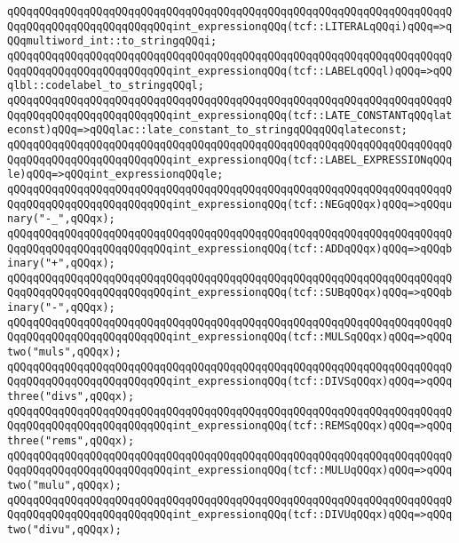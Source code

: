 \verb|qQQqqQQqqQQqqQQqqQQqqQQqqQQqqQQqqQQqqQQqqQQqqQQqqQQqqQQqqQQqqQQqqQQqqQQqqQQqqQQqqQQqqQQqqQQqqQQqint_expressionqQQq(tcf::LITERALqQQqi)qQQq=>qQQqmultiword_int::to_stringqQQqi;|\newline
\verb|qQQqqQQqqQQqqQQqqQQqqQQqqQQqqQQqqQQqqQQqqQQqqQQqqQQqqQQqqQQqqQQqqQQqqQQqqQQqqQQqqQQqqQQqqQQqqQQqint_expressionqQQq(tcf::LABELqQQql)qQQq=>qQQqlbl::codelabel_to_stringqQQql;|\newline
\verb|qQQqqQQqqQQqqQQqqQQqqQQqqQQqqQQqqQQqqQQqqQQqqQQqqQQqqQQqqQQqqQQqqQQqqQQqqQQqqQQqqQQqqQQqqQQqqQQqint_expressionqQQq(tcf::LATE_CONSTANTqQQqlateconst)qQQq=>qQQqlac::late_constant_to_stringqQQqqQQqlateconst;|\newline
\verb|qQQqqQQqqQQqqQQqqQQqqQQqqQQqqQQqqQQqqQQqqQQqqQQqqQQqqQQqqQQqqQQqqQQqqQQqqQQqqQQqqQQqqQQqqQQqqQQqint_expressionqQQq(tcf::LABEL_EXPRESSIONqQQqle)qQQq=>qQQqint_expressionqQQqle;|\newline
\verb|qQQqqQQqqQQqqQQqqQQqqQQqqQQqqQQqqQQqqQQqqQQqqQQqqQQqqQQqqQQqqQQqqQQqqQQqqQQqqQQqqQQqqQQqqQQqqQQqint_expressionqQQq(tcf::NEGqQQqx)qQQq=>qQQqunary("-_",qQQqx);|\newline
\verb|qQQqqQQqqQQqqQQqqQQqqQQqqQQqqQQqqQQqqQQqqQQqqQQqqQQqqQQqqQQqqQQqqQQqqQQqqQQqqQQqqQQqqQQqqQQqqQQqint_expressionqQQq(tcf::ADDqQQqx)qQQq=>qQQqbinary("+",qQQqx);|\newline
\verb|qQQqqQQqqQQqqQQqqQQqqQQqqQQqqQQqqQQqqQQqqQQqqQQqqQQqqQQqqQQqqQQqqQQqqQQqqQQqqQQqqQQqqQQqqQQqqQQqint_expressionqQQq(tcf::SUBqQQqx)qQQq=>qQQqbinary("-",qQQqx);|\newline
\verb|qQQqqQQqqQQqqQQqqQQqqQQqqQQqqQQqqQQqqQQqqQQqqQQqqQQqqQQqqQQqqQQqqQQqqQQqqQQqqQQqqQQqqQQqqQQqqQQqint_expressionqQQq(tcf::MULSqQQqx)qQQq=>qQQqtwo("muls",qQQqx);|\newline
\verb|qQQqqQQqqQQqqQQqqQQqqQQqqQQqqQQqqQQqqQQqqQQqqQQqqQQqqQQqqQQqqQQqqQQqqQQqqQQqqQQqqQQqqQQqqQQqqQQqint_expressionqQQq(tcf::DIVSqQQqx)qQQq=>qQQqthree("divs",qQQqx);|\newline
\verb|qQQqqQQqqQQqqQQqqQQqqQQqqQQqqQQqqQQqqQQqqQQqqQQqqQQqqQQqqQQqqQQqqQQqqQQqqQQqqQQqqQQqqQQqqQQqqQQqint_expressionqQQq(tcf::REMSqQQqx)qQQq=>qQQqthree("rems",qQQqx);|\newline
\verb|qQQqqQQqqQQqqQQqqQQqqQQqqQQqqQQqqQQqqQQqqQQqqQQqqQQqqQQqqQQqqQQqqQQqqQQqqQQqqQQqqQQqqQQqqQQqqQQqint_expressionqQQq(tcf::MULUqQQqx)qQQq=>qQQqtwo("mulu",qQQqx);|\newline
\verb|qQQqqQQqqQQqqQQqqQQqqQQqqQQqqQQqqQQqqQQqqQQqqQQqqQQqqQQqqQQqqQQqqQQqqQQqqQQqqQQqqQQqqQQqqQQqqQQqint_expressionqQQq(tcf::DIVUqQQqx)qQQq=>qQQqtwo("divu",qQQqx);|\newline
